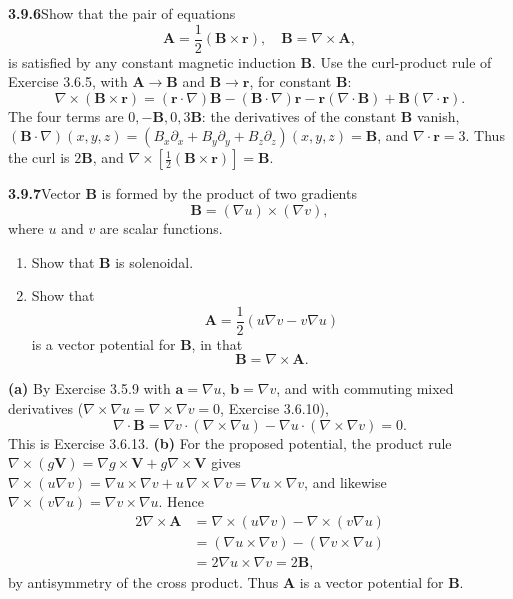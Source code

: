 \par\bigskip
\noindent\textbf{3.9.6}\quad Show that the pair of equations
\[
\mathbf{A}=\frac{1}{2}(\mathbf{B}\times\mathbf{r}),\quad
\mathbf{B}=\nabla\times\mathbf{A},
\]
is satisfied by any constant magnetic induction $\mathbf{B}$.
\solution
Use the curl-product rule of Exercise 3.6.5, with $\mathbf A\to\mathbf B$
and $\mathbf B\to\mathbf r$, for constant $\mathbf B$:
\[
\nabla\times(\mathbf B\times\mathbf r)
=(\mathbf r\cdot\nabla)\mathbf B-(\mathbf B\cdot\nabla)\mathbf r
-\mathbf r(\nabla\cdot\mathbf B)+\mathbf B(\nabla\cdot\mathbf r).
\]
The four terms are $0,-\mathbf B,0,3\mathbf B$: the derivatives of the
constant $\mathbf B$ vanish,
$(\mathbf B\cdot\nabla)(x,y,z)
=(B_x\partial_x+B_y\partial_y+B_z\partial_z)(x,y,z)=\mathbf B$, and
$\nabla\cdot\mathbf r=3$.
Thus the curl is $2\mathbf B$, and
$\boxed{\nabla\times[\tfrac12(\mathbf B\times\mathbf r)]=\mathbf B}$.

\par\bigskip
\noindent\textbf{3.9.7}\quad Vector $\mathbf{B}$ is formed by the product of
two gradients
\[
\mathbf{B}=(\nabla u)\times(\nabla v),
\]
where $u$ and $v$ are  scalar functions.
\begin{enumerate}
\item[(a)] Show that $\mathbf{B}$ is solenoidal.
\item[(b)] Show that
  \[
  \mathbf{A}=\frac{1}{2}(u\nabla v-v\nabla u)
  \]
  is a vector potential for $\mathbf{B}$, in that
  \[
  \mathbf{B}=\nabla\times\mathbf{A}.
  \]
\end{enumerate}
\solution
\textbf{(a)} By Exercise 3.5.9 with $\mathbf a=\nabla u$,
$\mathbf b=\nabla v$, and with commuting mixed derivatives
($\nabla\times\nabla u=\nabla\times\nabla v=0$, Exercise 3.6.10),
\[
\nabla\cdot\mathbf B=
\nabla v\cdot(\nabla\times\nabla u)
-\nabla u\cdot(\nabla\times\nabla v)=0.
\]
This is Exercise 3.6.13.
\textbf{(b)} For the proposed potential, the product rule
$\nabla\times(g\mathbf V)=\nabla g\times\mathbf V+g\nabla\times\mathbf V$
gives $\nabla\times(u\nabla v)=\nabla u\times\nabla v+u\,\nabla\times\nabla v
=\nabla u\times\nabla v$, and likewise
$\nabla\times(v\nabla u)=\nabla v\times\nabla u$. Hence
\[
\begin{aligned}
2\nabla\times\mathbf A
&=\nabla\times(u\nabla v)-\nabla\times(v\nabla u)\\
&=(\nabla u\times\nabla v)-(\nabla v\times\nabla u)\\
&=2\nabla u\times\nabla v=2\mathbf B,
\end{aligned}
\]
by antisymmetry of the cross product. Thus $\mathbf A$
is a vector potential for $\mathbf B$.

